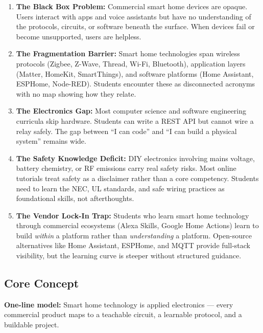 \documentclass[11pt,letterpaper]{article}
\begin{document}
\begin{enumerate}
  \item \textbf{The Black Box Problem:} Commercial smart home devices are opaque. Users interact with apps and voice assistants but have no understanding of the protocols, circuits, or software beneath the surface. When devices fail or become unsupported, users are helpless.

  \item \textbf{The Fragmentation Barrier:} Smart home technologies span wireless protocols (Zigbee, Z-Wave, Thread, Wi-Fi, Bluetooth), application layers (Matter, HomeKit, SmartThings), and software platforms (Home Assistant, ESPHome, Node-RED). Students encounter these as disconnected acronyms with no map showing how they relate.

  \item \textbf{The Electronics Gap:} Most computer science and software engineering curricula skip hardware. Students can write a REST API but cannot wire a relay safely. The gap between ``I can code'' and ``I can build a physical system'' remains wide.

  \item \textbf{The Safety Knowledge Deficit:} DIY electronics involving mains voltage, battery chemistry, or RF emissions carry real safety risks. Most online tutorials treat safety as a disclaimer rather than a core competency. Students need to learn the NEC, UL standards, and safe wiring practices as foundational skills, not afterthoughts.

  \item \textbf{The Vendor Lock-In Trap:} Students who learn smart home technology through commercial ecosystems (Alexa Skills, Google Home Actions) learn to build \textit{within} a platform rather than \textit{understanding} a platform. Open-source alternatives like Home Assistant, ESPHome, and MQTT provide full-stack visibility, but the learning curve is steeper without structured guidance.
\end{enumerate}

\subsection{Core Concept}

\begin{quotebox}
\textbf{One-line model:} Smart home technology is applied electronics --- every commercial product maps to a teachable circuit, a learnable protocol, and a buildable project.
\end{quotebox}
\end{document}
